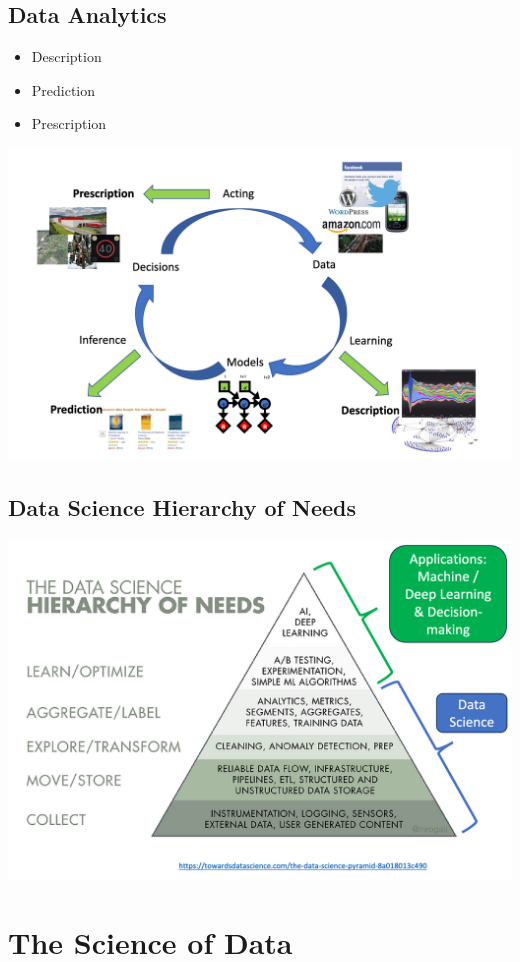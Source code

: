 \documentclass[11pt]{article}
\theoremstyle{definition}
\begin{document}
\subsection{Data Analytics}
\begin{itemize}
  \item Description
  \item Prediction
  \item Prescription
\end{itemize}
\includegraphics[width=\textwidth/2]{2.png}
\subsection{Data Science Hierarchy of Needs}
\includegraphics[width=\textwidth]{3.png}
\section{The Science of Data}
\end{document}
